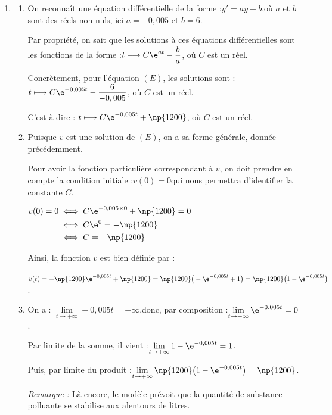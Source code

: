 \begin{enumerate}
	\item \begin{enumerate}
		\item On reconnaît une équation différentielle de la forme :\quad $y' = ay + b$,\quad où $a$ et $b$ sont des réels non nuls, ici $a = -0,005$ et $b = 6$.

		Par propriété, on sait que les solutions à ces équations différentielles sont les fonctions de la forme :\quad $t \longmapsto C\e^{at} - \dfrac{b}{a}$, \quad où $C$ est un réel.

		Concrètement, pour l'équation $(E)$, les solutions sont : \quad $t \longmapsto C\e^{-0,005t} - \dfrac{6}{-0,005}$, \quad où $C$ est un réel.

		C'est-à-dire : \quad $t \longmapsto C\e^{-0,005t} +\np{1200}$, \quad où $C$ est un réel.

		\item Puisque $v$ est une solution de $(E)$, on a sa forme générale, donnée précédemment.

		Pour avoir la fonction particulière correspondant à $v$, on doit prendre en compte la condition initiale :\quad $v(0) = 0$\quad qui nous permettra d'identifier la constante $C$.

		$\begin{aligned}
			v(0) = 0
			&\iff C\e^{-0,005\times 0} +\np{1200} = 0\\
			&\iff C\e^{0} = -\np{1200} \\
			&\iff C = -\np{1200}
		\end{aligned}$

		Ainsi, la fonction $v$ est bien définie par :

		$v(t) = -\np{1200}\e^{-0,005t} +\np{1200} = \np{1200}\big(-\e^{-0,005t} + 1\big) = \np{1200}\big(1 -\e^{-0,005t}\big)$.

		\item On a : \quad $\lim\limits_{t \to +\infty} -0,005t = - \infty$,\quad donc, par composition :\quad $\lim\limits_{t \to +\infty}\e^{-0,005t} = 0$.

		Par limite de la somme, il vient :\quad $\lim\limits_{t \to +\infty} 1 - \e^{-0,005t} = 1$.

		Puis, par limite du produit :\quad $\lim\limits_{t \to +\infty}\np{1200}\big(1-\e^{-0,005t}\big) = \np{1200}$.

		\emph{Remarque :} Là encore, le modèle prévoit que la quantité de substance polluante se stabilise aux alentours de  litres.


\end{enumerate}
\end{enumerate}

